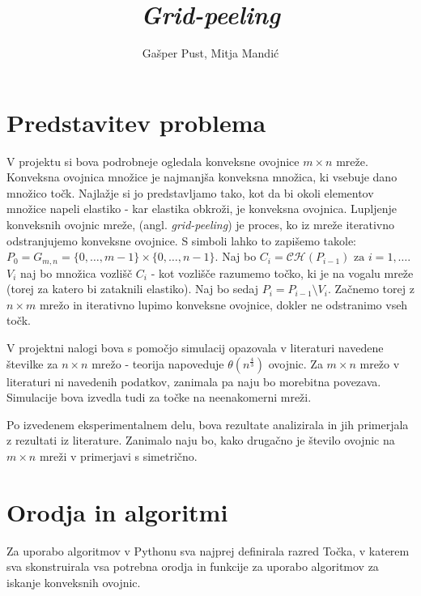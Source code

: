 \documentclass[a4paper]{article}
\title{\textit{Grid-peeling}}
\author{Gašper Pust, Mitja Mandić}
\begin{document}
\begin{titlepage}
 \maketitle
\end{titlepage}

\section{Predstavitev problema}
V projektu si bova podrobneje ogledala konveksne ovojnice $m \times n$ mreže. Konveksna ovojnica množice je najmanjša konveksna množica, ki vsebuje dano množico točk.
Najlažje si jo predstavljamo tako, kot da bi okoli elementov množice napeli elastiko - kar elastika obkroži, je konveksna ovojnica. Lupljenje konveksnih ovojnic mreže,
(angl. \textit{grid-peeling}) je proces, ko iz mreže iterativno odstranjujemo konveksne ovojnice. S simboli lahko to zapišemo takole:
$ P_{0} = G_{m,n} = \{0,\ldots, m-1\} \times \{0, \ldots, n-1\}$. Naj bo $C_{i} = \mathcal{C}\mathcal{H}(P_{i-1}) \text{ za } i = 1, \ldots$. $V_{i}$ naj bo množica vozlišč $C_{i}$
- kot vozlišče razumemo točko, ki je na vogalu mreže (torej za katero bi zataknili elastiko). Naj bo sedaj $P_{i} = P_{i-1} \setminus V_{i}$. Začnemo torej z $n \times m$ mrežo 
in iterativno lupimo konveksne ovojnice, dokler ne odstranimo vseh točk.

V projektni nalogi bova s pomočjo simulacij opazovala v literaturi navedene številke za $n \times n$ mrežo - teorija napoveduje $\theta(n ^ \frac{4}{3})$ ovojnic.
Za $m \times n$ mrežo v literaturi ni navedenih podatkov, zanimala pa naju bo morebitna povezava. Simulacije bova izvedla tudi za točke na neenakomerni mreži.

Po izvedenem eksperimentalnem delu, bova rezultate analizirala in jih primerjala z rezultati iz literature. Zanimalo naju bo, kako drugačno je število ovojnic na $m \times n$
mreži v primerjavi s simetrično.

\section{Orodja in algoritmi}
Za uporabo algoritmov v Pythonu sva najprej definirala razred Točka, v katerem sva skonstruirala vsa potrebna orodja in funkcije za uporabo algoritmov za iskanje konveksnih ovojnic.
\end{document}
